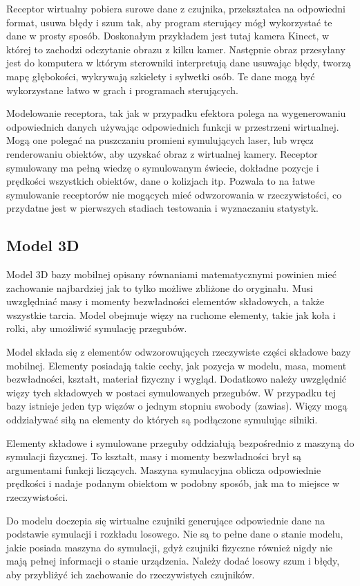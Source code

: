 	Receptor wirtualny pobiera surowe dane z czujnika, przekształca na odpowiedni format, usuwa błędy i szum tak, aby program sterujący mógł wykorzystać te dane w prosty sposób. 
	Doskonałym przykładem jest tutaj kamera Kinect, w której to zachodzi odczytanie obrazu z kilku kamer.
	Następnie obraz przesyłany jest do komputera w którym sterowniki interpretują dane usuwając błędy, tworzą mapę głębokości, wykrywają szkielety i sylwetki osób.
	Te dane mogą być wykorzystane łatwo w grach i programach sterujących.

	Modelowanie receptora, tak jak w przypadku efektora polega na wygenerowaniu odpowiednich danych używając odpowiednich funkcji w przestrzeni wirtualnej.
	Mogą one polegać na puszczaniu promieni symulujących laser, lub wręcz renderowaniu obiektów, aby uzyskać obraz z wirtualnej kamery.
	Receptor symulowany ma pełną wiedzę o symulowanym świecie, dokładne pozycje i prędkości wszystkich obiektów, dane o kolizjach itp. 
	Pozwala to na łatwe symulowanie receptorów nie mogących mieć odwzorowania w rzeczywistości, co przydatne jest w pierwszych stadiach testowania i wyznaczaniu statystyk.

	\subsection{Model 3D}
	Model 3D bazy mobilnej opisany równaniami matematycznymi powinien mieć zachowanie najbardziej jak to tylko możliwe zbliżone do oryginału.
	Musi uwzględniać masy i momenty bezwładności elementów składowych, a także wszystkie tarcia.
	Model obejmuje więzy na ruchome elementy, takie jak koła i rolki, aby umożliwić symulację przegubów.

	Model składa się z elementów odwzorowujących rzeczywiste części składowe bazy mobilnej.
	Elementy posiadają takie cechy, jak pozycja w modelu, masa, moment bezwładności, kształt, materiał fizyczny i wygląd.
	Dodatkowo należy uwzględnić więzy tych składowych w postaci symulowanych przegubów.
	W przypadku tej bazy istnieje jeden typ więzów o jednym stopniu swobody (zawias).
	Więzy mogą oddziaływać siłą na elementy do których są podłączone symulując silniki.

	Elementy składowe i symulowane przeguby oddziałują bezpośrednio z maszyną do symulacji fizycznej. 
	To kształt, masy i momenty bezwładności brył są argumentami funkcji liczących.
	Maszyna symulacyjna oblicza odpowiednie prędkości i nadaje podanym obiektom w podobny sposób, jak ma to miejsce w rzeczywistości.

	Do modelu doczepia się wirtualne czujniki generujące odpowiednie dane na podstawie symulacji i rozkładu losowego.
	Nie są to pełne dane o stanie modelu, jakie posiada maszyna do symulacji, gdyż czujniki fizyczne również nigdy nie mają pełnej informacji o stanie urządzenia.
	Należy dodać losowy szum i błędy, aby przybliżyć ich zachowanie do rzeczywistych czujników.

